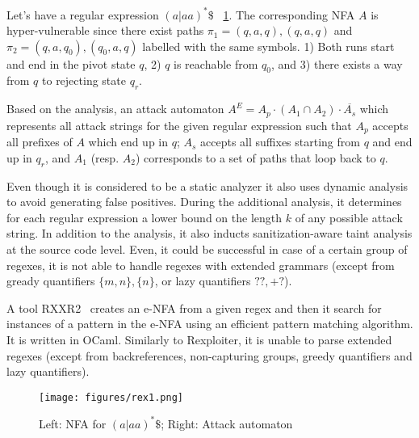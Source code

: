 \documentclass[acmsmall,screen]{acmart}
\begin{document}
\begin{example}
Let's have a regular expression $(a|aa)^*\$$ ~\cref{fig:rex}. The corresponding NFA $A$ is hyper-vulnerable since
there exist paths $\pi_1 = (q,a,q),(q,a,q)$ and $\pi_2 = (q,a,q_0),(q_0,a,q)$ labelled with the same symbols.
%
1) Both runs start and end in the pivot state $q$, 2) $q$ is reachable from $q_0$, and 3) there exists a way from $q$
to rejecting state $q_r$.
\end{example}

Based on the analysis, an attack automaton 
$A^{E} = A_p \cdot (A_1 \cap A_2) \cdot \overline{A_s}$
 which represents all attack strings for the given regular expression
such that $A_p$ accepts all prefixes of $A$ which end up in $q$; 
%
$A_s$ accepts all suffixes starting from $q$ and end up in $q_r$,
%
and $A_1$ (resp. $A_2$) corresponds to a set of paths that loop back to $q$.

%
Even though it is considered to be a static analyzer it also uses dynamic analysis
% 
to avoid generating false positives.
%
During the additional analysis, it determines for each regular expression 
a lower bound on the length $k$ of any possible attack string.
%
In addition to the analysis, it also inducts sanitization-aware taint analysis at the source code level.
%
Even, it could be successful in case of a certain group of regexes,
it is not able to handle regexes with extended grammars (except from gready quantifiers $\{m,n\},\{n\}$, or lazy quantifiers $??, +?$).




A tool RXXR2~\cite{rxxr2thesis, rxxr2} creates an e-NFA from a given regex and 
then it search for instances of a pattern
in the e-NFA using an efficient pattern matching algorithm.
%
It is written in OCaml.
%
Similarly to Rexploiter, it is unable to parse extended regexes (except from backreferences, non-capturing groups, greedy quantifiers and lazy quantifiers).

\begin{figure}
  \vspace{-3mm}
  \hspace{-10mm}
  \begin{center}
    \texttt{[image: figures/rex1.png]}
  \end{center}
\caption{Left: NFA for $(a|aa)^*\$$; Right: Attack automaton}
  \label{fig:rex}
\end{figure}
\end{document}
